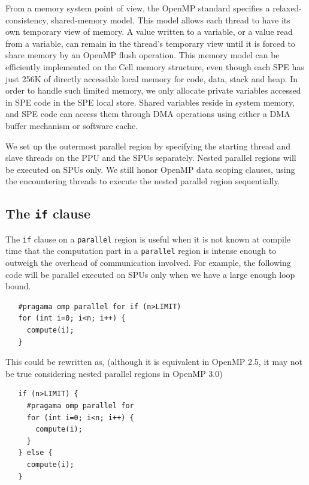 From a memory system point of view, the OpenMP standard specifies a
relaxed-consistency, shared-memory model. This model allows each thread to have
its own temporary view of memory. A value written to a variable, or a value
read from a variable, can remain in the thread's temporary view until it is
forced to share memory by an OpenMP flush operation. This memory model can be
efficiently implemented on the Cell memory structure, even though each SPE has
just 256K of directly accessible local memory for code, data, stack and heap.
In order to handle such limited memory, we only allocate private variables
accessed in SPE code in the SPE local store. Shared variables reside in system
memory, and SPE code can access them through DMA operations using either a DMA
buffer mechanism or software cache.

We set up the outermost parallel region by specifying the starting thread and
slave threads on the PPU and the SPUs separately. Nested parallel regions will
be executed on SPUs only. We still honor OpenMP data scoping clauses, using the
encountering threads to execute the nested parallel region sequentially.


\subsection{The \texttt{if} clause}

The \texttt{if} clause on a \texttt{parallel} region is useful when 
it is not known at compile time that
the computation part in a \texttt{parallel} region is
intense enough to outweigh the overhead of communication involved. For example,
the following code will be parallel executed on SPUs only when we have a large
enough loop bound.

{\small
\begin{verbatim}
   #pragama omp parallel for if (n>LIMIT)
   for (int i=0; i<n; i++) {
     compute(i); 
   }
\end{verbatim}
}

This could be rewritten as, (although it is equivalent in OpenMP 2.5, it may
not be true considering nested parallel regions in OpenMP 3.0)

{\small
\begin{verbatim}
   if (n>LIMIT) {
     #pragama omp parallel for 
     for (int i=0; i<n; i++) {
       compute(i); 
     }
   } else {
     compute(i); 
   }
\end{verbatim}
}

